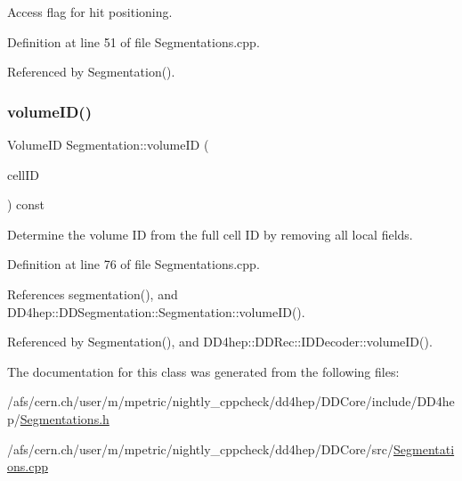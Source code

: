 Access flag for hit positioning. 



Definition at line 51 of file Segmentations.\+cpp.



Referenced by Segmentation().

\hypertarget{class_d_d4hep_1_1_geometry_1_1_segmentation_a0a9c55a7cfce856dd4919ce7b37aef02}{}\label{class_d_d4hep_1_1_geometry_1_1_segmentation_a0a9c55a7cfce856dd4919ce7b37aef02} 
\subsubsection{\texorpdfstring{volume\+I\+D()}{volumeID()}}
{\footnotesize\ttfamily Volume\+ID Segmentation\+::volume\+ID (\begin{DoxyParamCaption}\item[{const Cell\+ID \&}]{cell\+ID }\end{DoxyParamCaption}) const}



Determine the volume ID from the full cell ID by removing all local fields. 



Definition at line 76 of file Segmentations.\+cpp.



References segmentation(), and D\+D4hep\+::\+D\+D\+Segmentation\+::\+Segmentation\+::volume\+I\+D().



Referenced by Segmentation(), and D\+D4hep\+::\+D\+D\+Rec\+::\+I\+D\+Decoder\+::volume\+I\+D().



The documentation for this class was generated from the following files\+:\begin{DoxyCompactItemize}
\item 
/afs/cern.\+ch/user/m/mpetric/nightly\+\_\+cppcheck/dd4hep/\+D\+D\+Core/include/\+D\+D4hep/\hyperlink{_segmentations_8h}{Segmentations.\+h}\item 
/afs/cern.\+ch/user/m/mpetric/nightly\+\_\+cppcheck/dd4hep/\+D\+D\+Core/src/\hyperlink{_segmentations_8cpp}{Segmentations.\+cpp}\end{DoxyCompactItemize}
